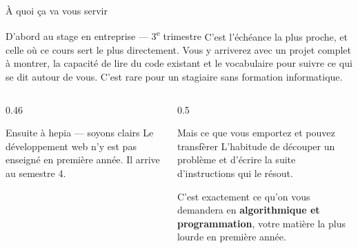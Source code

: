 \documentclass[aspectratio=169,11pt]{beamer}
\begin{document}
\begin{frame}{À quoi ça va vous servir}
  \vspace{0.15cm}
  \begin{exampleblock}{D'abord au stage en entreprise --- 3\textsuperscript{e} trimestre}
    \small C'est l'échéance la plus proche, et celle où ce cours sert le plus directement. Vous y arriverez avec un projet complet à montrer, la capacité de lire du code existant et le vocabulaire pour suivre ce qui se dit autour de vous. C'est rare pour un stagiaire sans formation informatique.
  \end{exampleblock}
  \vspace{0.25cm}
  \begin{columns}[T]
    \begin{column}{0.46\textwidth}
      \begin{alertblock}{Ensuite à hepia --- soyons clairs}
        \small Le développement web n'y est pas enseigné en première année. Il arrive au semestre 4.
      \end{alertblock}
    \end{column}
    \begin{column}{0.5\textwidth}
      \begin{block}{Mais ce que vous emportez et pouvez transfèrer}
        \small L'habitude de découper un problème et d'écrire la suite d'instructions qui le résout.
        \smallskip

        C'est exactement ce qu'on vous demandera en \textbf{algorithmique et programmation}, votre matière la plus lourde en première année.
      \end{block}
    \end{column}
  \end{columns}
\end{frame}
\end{document}

